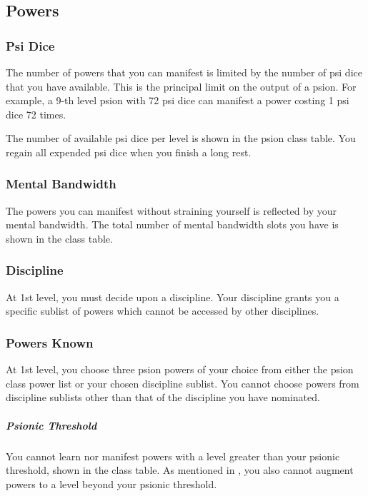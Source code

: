 \subsection{Powers}
\subsubsection{Psi Dice}
The number of powers that you can manifest
is limited by the number of psi dice that
you have available.
This is the principal limit on the output of a psion.
For example, a 9-th level psion with 72 psi dice
can manifest a power costing 1 psi dice 72 times.

The number of available psi dice per level
is shown in the psion class table.
You regain all expended psi dice when you finish
a long rest.

\subsubsection{Mental Bandwidth}
The powers you can manifest without straining yourself
is reflected by your mental bandwidth.
The total number of mental bandwidth slots you have
is shown in the class table.

\subsubsection{Discipline}
At 1st level,
you must decide upon a discipline.
Your discipline grants you a specific sublist of powers
which cannot be accessed by other disciplines.

\subsubsection{Powers Known}
At 1st level,
you choose three psion powers of your choice
from either the psion class power list
or your chosen discipline sublist.
You cannot choose powers from discipline sublists
other than that of the discipline you have nominated.

\subparagraph{Psionic Threshold}
You cannot learn nor manifest powers with a level
greater than your psionic threshold,
shown in the class table.
As mentioned in ,
you also cannot augment powers to a level
beyond your psionic threshold.

